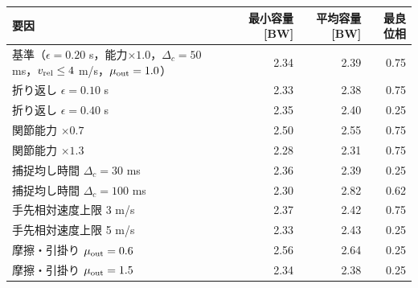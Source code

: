 \begin{tabular}{lrrr}
\toprule
要因 & 最小容量 [BW] & 平均容量 [BW] & 最良位相 \\
\midrule
基準（$\epsilon=0.20$ s，能力$\times1.0$，$\Delta_c=50$ ms，$v_{\rm rel}\le4$ m/s，$\mu_{\rm out}=1.0$） & 2.34 & 2.39 & 0.75 \\
折り返し $\epsilon=0.10$ s & 2.33 & 2.38 & 0.75 \\
折り返し $\epsilon=0.40$ s & 2.35 & 2.40 & 0.25 \\
関節能力 $\times0.7$ & 2.50 & 2.55 & 0.75 \\
関節能力 $\times1.3$ & 2.28 & 2.31 & 0.75 \\
捕捉均し時間 $\Delta_c=30$ ms & 2.36 & 2.39 & 0.25 \\
捕捉均し時間 $\Delta_c=100$ ms & 2.30 & 2.82 & 0.62 \\
手先相対速度上限 3 m/s & 2.37 & 2.42 & 0.75 \\
手先相対速度上限 5 m/s & 2.33 & 2.43 & 0.25 \\
摩擦・引掛り $\mu_{\rm out}=0.6$ & 2.56 & 2.64 & 0.25 \\
摩擦・引掛り $\mu_{\rm out}=1.5$ & 2.34 & 2.38 & 0.25 \\
\bottomrule
\end{tabular}
